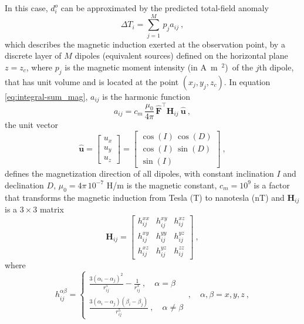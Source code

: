 \documentclass[manuscript]{geophysics}
\providecommand{\DIFaddtex}[1]{{\protect\color{blue}\uwave{#1}}} %
\providecommand{\DIFaddbegin}{} %
\providecommand{\DIFaddend}{} %
\providecommand{\DIFadd}[1]{\texorpdfstring{\DIFaddtex{#1}}{#1}} %
\begin{document}
In this case, $d^{o}_{i}$ can be approximated by the predicted total-field anomaly \DIFaddbegin \DIFadd{\mbox{%
\citep{blakely1996}
}\hskip0pt%
}\DIFaddend \begin{equation}
	\Delta T_{i} = \sum_{j=1}^{M} \, p_{j} a_{ij} \: ,
	\label{eq:integral-sum_mag}
\end{equation}
which describes the magnetic induction exerted at the observation point,
by a discrete layer of $M$ dipoles (equivalent sources) defined on the horizontal plane $z = z_{c}$, 
where $p_{j}$ is the magnetic moment intensity (in A~m~$^{2}$)~of the $j$th dipole, 
that has unit volume and is located at the point $(x_{j}, y_{j}, z_{c})$. In equation
\ref{eq:integral-sum_mag}, $a_{ij}$ is the harmonic function
\begin{equation}
	a_{ij}
	= c_{m} \, \frac{\mu_{0}}{4\pi} \, \hat{\mathbf{F}}^{\top} \mathbf{H}_{ij} \: \hat{\mathbf{u}} \: ,
	\label{eq:aij_mag}
\end{equation}
the unit vector
\begin{equation}
	\hat{\mathbf{u}} = \begin{bmatrix}
		u_x \\
		u_y \\
		u_z
	\end{bmatrix} =
	\begin{bmatrix}
		\cos(I) \, \cos(D) \\
		\cos(I) \, \sin(D) \\
		\sin(I)
	\end{bmatrix} \: ,
	\label{eq:u_hat}
\end{equation}
defines the magnetization direction of all dipoles, with constant inclination $I$ and declination $D$,
$\mu_{0} = 4\pi \, 10^{-7}$ H/m is the magnetic constant, $c_{m} = 10^{9}$ is a factor that transforms
the magnetic induction from Tesla (T) to nanotesla (nT) and $\mathbf{H}_{ij}$ is a $3 \times 3$ matrix 
\begin{equation}
	\mathbf{H}_{ij} = \begin{bmatrix}
		h^{xx}_{ij} & h^{xy}_{ij} & h^{xz}_{ij} \\
		h^{xy}_{ij} & h^{yy}_{ij} & h^{yz}_{ij} \\
		h^{xz}_{ij} & h^{yz}_{ij} & h^{zz}_{ij}
	\end{bmatrix} \: ,
	\label{eq:Hij}
\end{equation}
where 
\begin{equation}
	h^{\alpha\beta}_{ij} = 
	\begin{cases}
		\frac{3 \left( \alpha_{i} - \alpha_{j} \right)^{2}}{r_{ij}^{5}} - \frac{1}{r_{ij}^{3}} \: , \quad \alpha = \beta \\
		\frac{3 \left( \alpha_{i} - \alpha_{j} \right) \left( \beta_{i} - \beta_{j} \right)}{r_{ij}^{5}} \: , \quad \alpha \ne \beta
	\end{cases} \: , \quad \alpha, \beta = x, y, z \: ,
	\label{eq:hij_alpha_beta}
\end{equation}
\end{document}
